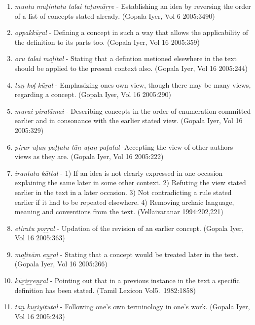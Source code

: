 \begin{enumerate}
 \item \textit{muntu muṭintatu talai taṭumāṟṟe} - Establishing an idea by reversing the order of a list of concepts stated already. (Gopala Iyer, Vol 6 2005:3490)

 \item \textit{oppakkūṟal} - Defining a concept in such a way that allows the applicability of the definition to its parts too. (Gopala Iyer, Vol 16 2005:359)

 \item \textit{oru talai moḻital} - Stating that a defintion metioned elsewhere in the text should be applied to the present context also. (Gopala Iyer, Vol 16 2005:244)

 \item \textit{taṉ koḷ kūṟal} - Emphasizing ones own view, though there may be many views, regarding a concept. (Gopala Iyer, Vol 16 2005:290)

 \item \textit{muṟai piṟaḻāmai} - Describing concepts in the order of enumeration committed earlier and in consonance with the earlier stated view. (Gopala Iyer, Vol 16 2005:329)

 \item \textit{piṟar uṭaṉ paṭṭatu tāṉ uṭaṉ paṭutal} -Accepting the view of other authors views as they are. (Gopala Iyer, Vol 16 2005:222)

 \item \textit{iṟantatu kāttal} - 1) If an idea is not clearly expressed in one occasion explaining the same later in some other context. 2) Refuting the view stated earlier in the text in a later occasion. 3) Not contradicting a rule stated earlier if it had to be repeated elsewhere. 4) Removing archaic language, meaning and conventions from the text. (Vellaivaranar 1994:202,221)

 \item \textit{etiratu poṟṟal} - Updation of the revision of an earlier concept. (Gopala Iyer, Vol 16 2005:363)

 \item \textit{moḻivām eṉṟal} - Stating that a concept would be treated later in the text. (Gopala Iyer, Vol 16 2005:266)

 \item \textit{kūṟiṟṟeṉṟal} - Pointing out that in a previous instance in the text a specific definition has been stated. (Tamil Lexicon Vol5.~1982:1858)

 \item \textit{tāṉ kuṟiyiṭutal} - Following one’s own terminology in one’s work. (Gopala Iyer, Vol 16 2005:243)


\end{enumerate}
